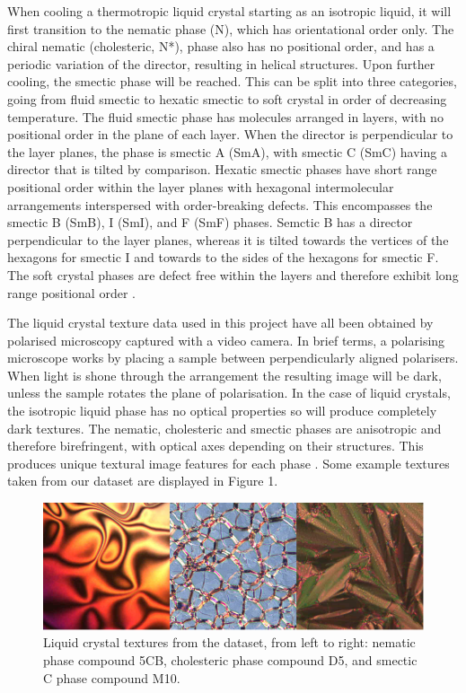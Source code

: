 \documentclass[12pt]{article}
\begin{document}
When cooling a thermotropic liquid crystal starting as an isotropic liquid, it will first transition to the nematic phase (N), which has orientational order only. The chiral nematic (cholesteric, N*), phase also has no positional order, and has a periodic variation of the director, resulting in helical structures. Upon further cooling, the smectic phase will be reached. This can be split into three categories, going from fluid smectic to hexatic smectic to soft crystal in order of decreasing temperature. The fluid smectic phase has molecules arranged in layers, with no positional order in the plane of each layer. When the director is perpendicular to the layer planes, the phase is smectic A (SmA), with smectic C (SmC) having a director that is tilted by comparison. Hexatic smectic phases have short range positional order within the layer planes with hexagonal intermolecular arrangements interspersed with order-breaking defects. This encompasses the smectic B (SmB), I (SmI), and F (SmF) phases. Semctic B has a director perpendicular to the layer planes, whereas it is tilted towards the vertices of the hexagons for smectic I and towards to the sides of the hexagons for smectic F. The soft crystal phases are defect free within the layers and therefore exhibit long range positional order \cite{Dierking03}.

The liquid crystal texture data used in this project have all been obtained by polarised microscopy captured with a video camera. In brief terms, a polarising microscope works by placing a sample between perpendicularly aligned polarisers. When light is shone through the arrangement the resulting image will be dark, unless the sample rotates the plane of polarisation. In the case of liquid crystals, the isotropic liquid phase has no optical properties so will produce completely dark textures. The nematic, cholesteric and smectic phases are anisotropic and therefore birefringent, with optical axes depending on their structures. This produces unique textural image features for each phase \cite{Dierking03}. Some example textures taken from our dataset are displayed in Figure 1.

\begin{figure}[h]
\centering
\includegraphics[width=6in]{images/texture_samples.png}
\caption{Liquid crystal textures from the dataset, from left to right: nematic phase compound 5CB, cholesteric phase compound D5, and smectic C phase compound M10.}
\end{figure}
\end{document}
